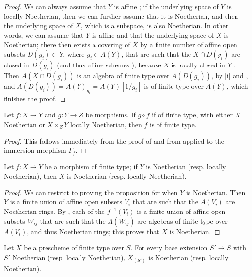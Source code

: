\begin{proof}
We can always assume that $Y$ is affine ;
if the underlying space of $Y$ is locally Noetherian, then we can further assume that it is Noetherian, and then the underlying space of $X$, which is a subspace, is also Noetherian.
In other words, we can assume that $Y$ is affine and that the underlying space of $X$ is Noetherian;
there then exists a covering of $X$ by a finite number of affine open subsets $D(g_i)\subset Y$, where $g_i\in A(Y)$, that are such that the $X\cap D(g_i)$ are closed in $D(g_i)$ (and thus affine schemes ), because $X$ is locally closed in $Y$ .
Then $A(X\cap D(g_i))$ is an algebra of finite type over $A(D(g_i))$, by [i] and , and $A(D(g_i))=A(Y)_{g_i}=A(Y)[1/g_i]$ is of finite type over $A(Y)$, which finishes the proof.
\end{proof}

\begin{corollary}[6.3.6]
\label{I.6.3.6}
Let $f:X\to Y$ and $g:Y\to Z$ be morphisms.
If $g\circ f$ if of finite type, with either $X$ Noetherian or $X\times_Z Y$ locally Noetherian, then $f$ is of finite type.
\end{corollary}

\begin{proof}
This follows immediately from the proof of  and from  applied to the immersion morphism $\Gamma_f$.
\end{proof}

\begin{proposition}[6.3.7]
\label{I.6.3.7}
Let $f:X\to Y$ be a morphism of finite type;
if $Y$ is Noetherian (resp. locally Noetherian), then $X$ is Noetherian (resp. locally Noetherian).
\end{proposition}

\begin{proof}
We can restrict to proving the proposition for when $Y$ is Noetherian.
Then $Y$ is a finite union of affine open subsets $V_i$ that are such that the $A(V_i)$ are Noetherian rings.
By , each of the $f^{-1}(V_i)$ is a finite union of affine open subsets $W_{ij}$ that are such that the $A(W_{ij})$ are algebras of finite type over $A(V_i)$, and thus Noetherian rings;
this proves that $X$ is Noetherian.
\end{proof}

\begin{corollary}[6.3.8]
\label{I.6.3.8}
Let $X$ be a prescheme of finite type over $S$.
For every base extension $S'\to S$ with $S'$ Noetherian (resp. locally Noetherian), $X_{(S')}$ is Noetherian (resp. locally Noetherian).
\end{corollary}

